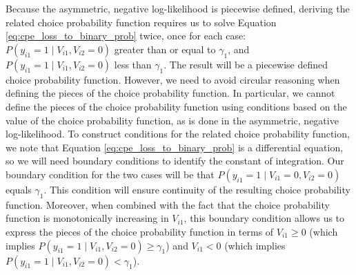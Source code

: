 Because the asymmetric, negative log-likelihood is piecewise defined, deriving the related choice probability function requires us to solve Equation \ref{eq:cpe_loss_to_binary_prob} twice, once for each case: $P \left( y_{i1} = 1 \mid V_{i1}, V_{i2} = 0 \right)$ greater than or equal to $\gamma_1$, and $P \left( y_{i1} = 1 \mid V_{i1}, V_{i2} = 0 \right)$ less than $\gamma_1$. The result will be a piecewise defined choice probability function. However, we need to avoid circular reasoning when defining the pieces of the choice probability function. In particular, we cannot define the pieces of the choice probability function using conditions based on the value of the choice probability function, as is done in the asymmetric, negative log-likelihood. To construct conditions for the related choice probability function, we note that Equation \ref{eq:cpe_loss_to_binary_prob} is a differential equation, so we will need boundary conditions to identify the constant of integration. Our boundary condition for the two cases will be that $P \left( y_{i1} = 1 \mid V_{i1} = 0, V_{i2} = 0 \right)$ equals $\gamma_1$. This condition will ensure continuity of the resulting choice probability function. Moreover, when combined with the fact that the choice probability function is monotonically increasing in $V_{i1}$, this boundary condition allows us to express the pieces of the choice probability function in terms of $V_{i1} \geq 0$ (which implies $P \left( y_{i1} = 1 \mid V_{i1}, V_{i2} = 0 \right) \geq \gamma_1$) and $V_{i1} < 0$ (which implies $P \left( y_{i1} = 1 \mid V_{i1}, V_{i2} = 0 \right) < \gamma_1$).

